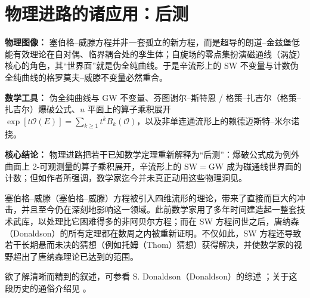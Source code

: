 
\section{物理进路的诸应用：后测}

\begin{keytakeaways}
\item \textbf{物理图像：} 塞伯格--威滕方程并非一套孤立的新方程，而是超导的朗道--金兹堡低能有效理论在自对偶、临界耦合处的孪生体；自旋场的零点集扮演磁通线（涡旋）核心的角色，其“世界面”就是伪全纯曲线。于是辛流形上的 SW 不变量与计数伪全纯曲线的格罗莫夫--威滕不变量必然重合。
\item \textbf{数学工具：} 伪全纯曲线与 GW 不变量、芬图谢尔--斯特恩 / 格策--扎吉尔（格策--扎吉尔）爆破公式、$u$ 平面上的算子乘积展开 $\exp[t\mathcal{O}(E)]=\sum_{k\ge1}t^{k}B_{k}(\mathcal{O})$，以及非单连通流形上的赖德迈斯特--米尔诺挠。
\item \textbf{核心结论：} 物理进路把若干已知数学定理重新解释为“后测”：爆破公式成为例外曲面上 2-可观测量的算子乘积展开，辛流形上的 $\mathrm{SW}=\mathrm{GW}$ 成为磁通线世界面的计数；但如作者所强调，数学家迄今并未真正动用这些物理洞见。
\end{keytakeaways}

塞伯格--威滕（塞伯格--威滕）方程被引入四维流形的理论，带来了直接而巨大的冲击，并且至今仍在深刻地影响这一领域。此前数学家用了多年时间建造起一整套技术武库，以处理比它困难得多的非阿贝尔方程；而在 SW 方程问世之后，唐纳森（Donaldson）的所有定理都在数周之内被重新证明。不仅如此，SW 方程还导致若干长期悬而未决的猜想（例如托姆（Thom）猜想）获得解决，并使数学家的视野超出了唐纳森理论已达到的范围。


欲了解清晰而精到的叙述，可参看 S. Donaldson（Donaldson）的综述 \cite{ref9}；关于这段历史的通俗介绍见 \cite{ref19,ref20}。

